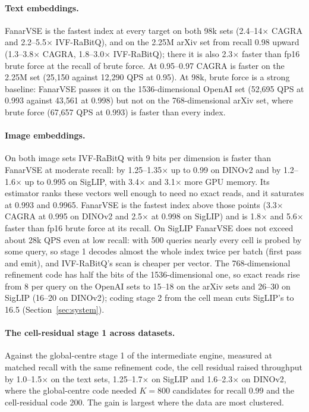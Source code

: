 \documentclass[fleqn,10pt]{wlscirep}
\begin{document}
\paragraph{Text embeddings.} FanarVSE is the fastest index at every target on both 98k sets (2.4--14$\times$ CAGRA and 2.2--5.5$\times$ IVF-RaBitQ), and on the 2.25M arXiv set from recall 0.98 upward (1.3--3.8$\times$ CAGRA, 1.8--3.0$\times$ IVF-RaBitQ); there it is also 2.3$\times$ faster than fp16 brute force at the recall of brute force. At 0.95--0.97 CAGRA is faster on the 2.25M set (25{,}150 against 12{,}290 QPS at 0.95). At 98k, brute force is a strong baseline: FanarVSE passes it on the 1536-dimensional OpenAI set (52{,}695 QPS at 0.993 against 43{,}561 at 0.998) but not on the 768-dimensional arXiv set, where brute force (67{,}657 QPS at 0.993) is faster than every index.

\paragraph{Image embeddings.} On both image sets IVF-RaBitQ with 9 bits per dimension is faster than FanarVSE at moderate recall: by 1.25--1.35$\times$ up to 0.99 on DINOv2 and by 1.2--1.6$\times$ up to 0.995 on SigLIP, with 3.4$\times$ and 3.1$\times$ more GPU memory. Its estimator ranks these vectors well enough to need no exact reads, and it saturates at 0.993 and 0.9965. FanarVSE is the fastest index above those points (3.3$\times$ CAGRA at 0.995 on DINOv2 and 2.5$\times$ at 0.998 on SigLIP) and is 1.8$\times$ and 5.6$\times$ faster than fp16 brute force at its recall. On SigLIP FanarVSE does not exceed about 28k QPS even at low recall: with 500 queries nearly every cell is probed by some query, so stage 1 decodes almost the whole index twice per batch (first pass and emit), and IVF-RaBitQ's scan is cheaper per vector. The 768-dimensional refinement code has half the bits of the 1536-dimensional one, so exact reads rise from 8 per query on the OpenAI sets to 15--18 on the arXiv sets and 26--30 on SigLIP (16--20 on DINOv2); coding stage 2 from the cell mean cuts SigLIP's to 16.5 (Section~\ref{sec:system}).

\paragraph{The cell-residual stage 1 across datasets.} Against the global-centre stage 1 of the intermediate engine, measured at matched recall with the same refinement code, the cell residual raised throughput by 1.0--1.5$\times$ on the text sets, 1.25--1.7$\times$ on SigLIP and 1.6--2.3$\times$ on DINOv2, where the global-centre code needed $K=800$ candidates for recall 0.99 and the cell-residual code 200. The gain is largest where the data are most clustered.
\end{document}
